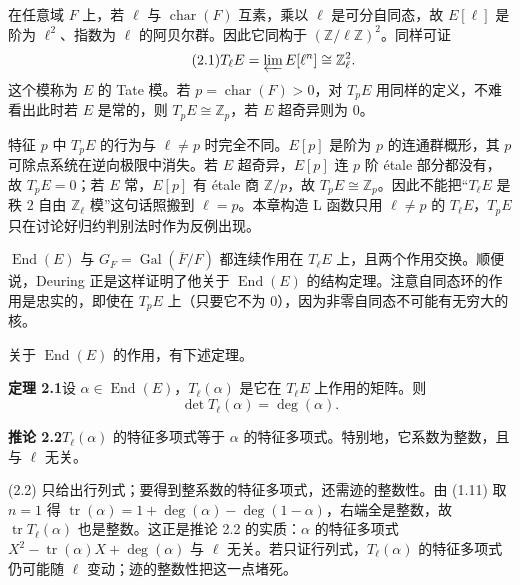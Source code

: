 在任意域 $F$ 上，若 $\ell$ 与 $\operatorname{char}(F)$ 互素，乘以 $\ell$ 是可分自同态，故 $E[\ell]$ 是阶为 $\ell^2$、指数为 $\ell$ 的阿贝尔群。因此它同构于 $(\mathbb{Z}/\ell\mathbb{Z})^2$。同样可证
\begin{equation}\tag{2.1}\label{c5:eq:2.1}
T_\ell E=\varprojlim E[\ell^n]\cong\mathbb{Z}_\ell^2.
\end{equation}
这个模称为 $E$ 的 Tate 模。若 $p=\operatorname{char}(F)>0$，对 $T_pE$ 用同样的定义，不难看出此时若 $E$ 是常的，则 $T_pE\cong\mathbb{Z}_p$，若 $E$ 超奇异则为 $0$。

\begin{annote}
特征 $p$ 中 $T_pE$ 的行为与 $\ell\neq p$ 时完全不同。$E[p]$ 是阶为 $p$ 的连通群概形，其 $p$ 可除点系统在逆向极限中消失。若 $E$ 超奇异，$E[p]$ 连 $p$ 阶 étale 部分都没有，故 $T_pE=0$；若 $E$ 常，$E[p]$ 有 étale 商 $\mathbb{Z}/p$，故 $T_pE\cong\mathbb{Z}_p$。因此不能把“$T_\ell E$ 是秩 $2$ 自由 $\mathbb{Z}_\ell$ 模”这句话照搬到 $\ell=p$。本章构造 L 函数只用 $\ell\neq p$ 的 $T_\ell E$，$T_pE$ 只在讨论好归约判别法时作为反例出现。
\par\vspace{0.15em}{\raggedleft 【来源：Silverman《The Arithmetic of Elliptic Curves》第 III、V 章（A）；Tate《$p$-divisible groups》（A）】\par}
\end{annote}

$\operatorname{End}(E)$ 与 $G_F=\operatorname{Gal}(\overline{F}/F)$ 都连续作用在 $T_\ell E$ 上，且两个作用交换。顺便说，Deuring 正是这样证明了他关于 $\operatorname{End}(E)$ 的结构定理。注意自同态环的作用是忠实的，即使在 $T_pE$ 上（只要它不为 $0$），因为非零自同态不可能有无穷大的核。

关于 $\operatorname{End}(E)$ 的作用，有下述定理。

\par\medskip\noindent\textbf{定理 2.1}\quad 设 $\alpha\in\operatorname{End}(E)$，$T_\ell(\alpha)$ 是它在 $T_\ell E$ 上作用的矩阵。则
\begin{equation}\tag{2.2}\label{c5:eq:2.2}
\det T_\ell(\alpha)=\deg(\alpha).
\end{equation}

\par\medskip\noindent\textbf{推论 2.2}\quad $T_\ell(\alpha)$ 的特征多项式等于 $\alpha$ 的特征多项式。特别地，它系数为整数，且与 $\ell$ 无关。

\begin{annote}
(2.2) 只给出行列式；要得到整系数的特征多项式，还需迹的整数性。由 (1.11) 取 $n=1$ 得 $\operatorname{tr}(\alpha)=1+\deg(\alpha)-\deg(1-\alpha)$，右端全是整数，故 $\operatorname{tr}T_\ell(\alpha)$ 也是整数。这正是推论 2.2 的实质：$\alpha$ 的特征多项式 $X^2-\operatorname{tr}(\alpha)X+\deg(\alpha)$ 与 $\ell$ 无关。若只证行列式，$T_\ell(\alpha)$ 的特征多项式仍可能随 $\ell$ 变动；迹的整数性把这一点堵死。
\par\vspace{0.15em}{\raggedleft 【来源：Silverman《The Arithmetic of Elliptic Curves》第 III 章（A）；原书 (1.11) 与定理 2.1（A）】\par}
\end{annote}

